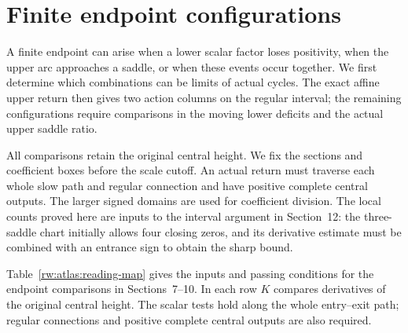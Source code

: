 \section{Finite endpoint configurations}
\label{rw:finite-local}

A finite endpoint can arise when a lower scalar factor loses positivity,
when the upper arc approaches a saddle, or when these events occur
together. We first determine which combinations can be limits of actual
cycles. The exact affine upper return then gives two action columns on
the regular interval; the remaining configurations require comparisons
in the moving lower deficits and the actual upper saddle ratio.

All comparisons retain the original central height. We fix the sections
and coefficient boxes before the scale cutoff. An actual return must
traverse each whole slow path and regular connection and have positive
complete central outputs. The larger signed domains are used for
coefficient division. The local counts proved here are inputs to the
interval argument in Section~12: the three-saddle chart initially allows
four closing zeros, and its derivative estimate must be combined with
an entrance sign to obtain the sharp bound.

Table~\ref{rw:atlas:reading-map} gives the inputs and passing conditions
for the endpoint comparisons in Sections~7--10. In each row $K$
compares derivatives of the original central height. The scalar tests
hold along the whole entry--exit path; regular connections and positive
complete central outputs are also required.

